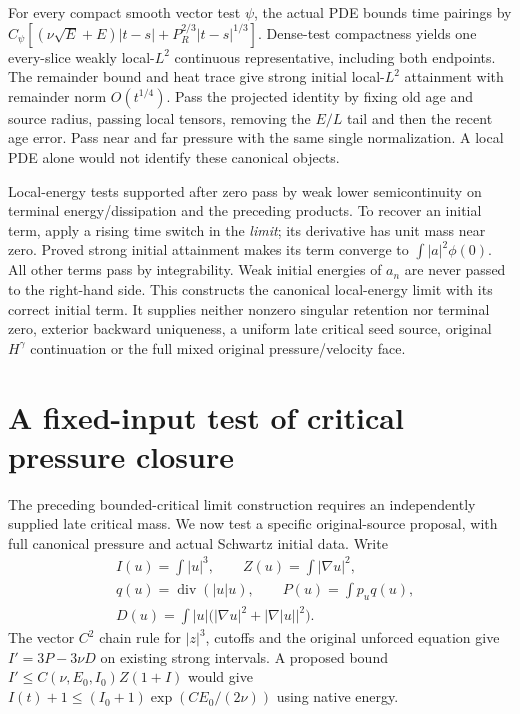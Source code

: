\documentclass[11pt]{article}
\begin{document}
For every compact smooth vector test $\psi$, the actual PDE bounds time
pairings by $C_\psi[(\nu\sqrt E+E)|t-s|+P_R^{2/3}|t-s|^{1/3}]$.
Dense-test compactness yields one every-slice weakly local-$L^2$ continuous
representative, including both endpoints. The remainder bound and heat
trace give strong initial local-$L^2$ attainment with remainder norm
$O(t^{1/4})$. Pass the projected identity by fixing old age and source
radius, passing local tensors, removing the $E/L$ tail and then the recent
age error. Pass near and far pressure with the same single normalization.
A local PDE alone would not identify these canonical objects.

Local-energy tests supported after zero pass by weak lower semicontinuity
on terminal energy/dissipation and the preceding products. To recover an
initial term, apply a rising time switch in the \emph{limit}; its derivative
has unit mass near zero. Proved strong initial attainment makes its term
converge to $\int|a|^2\phi(0)$. All other terms pass by integrability.
Weak initial energies of $a_n$ are never passed to the right-hand side.
This constructs the canonical local-energy limit with its correct initial
term. It supplies neither nonzero singular retention nor terminal zero,
exterior backward uniqueness, a uniform late critical seed source, original
$H^\gamma$ continuation or the full mixed original pressure/velocity face.

\section{A fixed-input test of critical pressure closure}
\label{sec:critical-pressure-source-control}

The preceding bounded-critical limit construction requires an independently
supplied late critical mass. We now test a specific original-source proposal,
with full canonical pressure and actual Schwartz initial data. Write
\[
\begin{aligned}
 &I(u)=\int |u|^3,\qquad Z(u)=\int |\nabla u|^2,\\
 &q(u)=\operatorname{div}(|u|u),\qquad P(u)=\int p_u q(u),\\
 &D(u)=\int |u|\bigl(|\nabla u|^2+|\nabla|u||^2\bigr).
\end{aligned}
\]
The vector $C^2$ chain rule for $|z|^3$, cutoffs and the original
unforced equation give $I'=3P-3\nu D$ on existing strong intervals.
A proposed bound $I'\le C(\nu,E_0,I_0)Z(1+I)$ would give
$I(t)+1\le(I_0+1)\exp(CE_0/(2\nu))$ using native energy.
\end{document}

